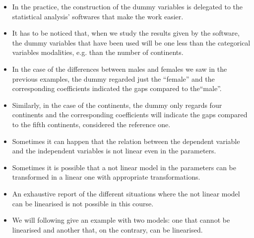 \begin{frame}
  \begin{itemize}
    \item In the practice, the construction of the dummy variables is delegated to the statistical analysis' softwares that make the work easier.
    \item It has to be noticed that, when we study the results given by the software, the dummy variables that have been used will be one less than the categorical variables modalities, e.g. than the number of continents. 
    \item In the case of the differences between males and females we saw in the previous examples, the dummy regarded just the ``female'' and the corresponding coefficients indicated the gaps compared to the``male''.
    \item Similarly, in the case of the continents, the dummy only regards four continents and the corresponding coefficients will indicate the gaps compared to the fifth continents, considered the reference one.
  \end{itemize}
\end{frame}


\begin{frame}
  \vspace{0.25cm}
  \begin{itemize}
    \item Sometimes it can happen that the relation between the dependent variable and the independent variables is not linear even in the parameters.
    \vspace{0.25cm}
    \item Sometimes it is possible that a not linear model in the parameters can be transformed in a linear one with appropriate transformations.
    \vspace{0.25cm}
    \item An exhaustive report of the different situations where the not linear model can be linearised is not possible in this course.
    \vspace{0.25cm}
    \item We will following give an example with two models: one that cannot be linearised and another that, on the contrary, can be linearised. 
  \end{itemize}
\end{frame}

